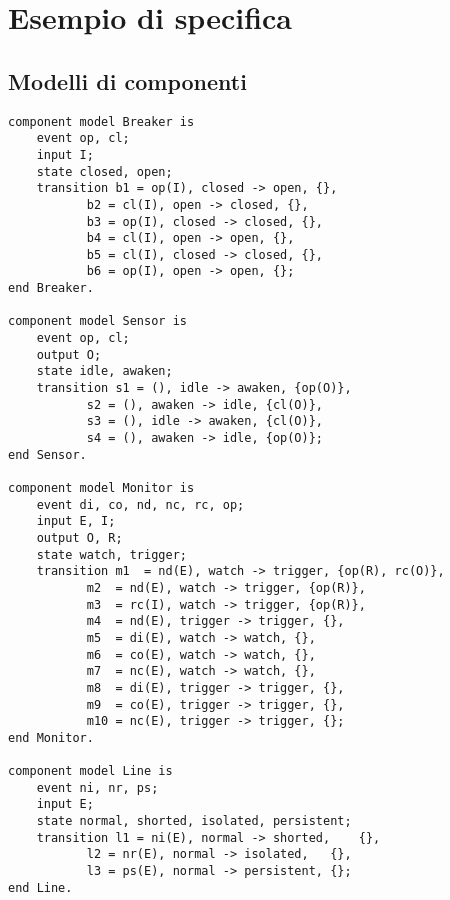 \chapter{Esempio di specifica} \label{spec_ex}
\section{Modelli di componenti}
\begin{verbatim}
component model Breaker is
	event op, cl;
	input I;
	state closed, open;
	transition b1 = op(I), closed -> open, {},
		   b2 = cl(I), open -> closed, {},
	 	   b3 = op(I), closed -> closed, {},
		   b4 = cl(I), open -> open, {},
		   b5 = cl(I), closed -> closed, {},
		   b6 = op(I), open -> open, {};
end Breaker.

component model Sensor is
	event op, cl;
	output O;
	state idle, awaken;
	transition s1 = (), idle -> awaken, {op(O)},
		   s2 = (), awaken -> idle, {cl(O)},
		   s3 = (), idle -> awaken, {cl(O)},
		   s4 = (), awaken -> idle, {op(O)};
end Sensor.

component model Monitor is
	event di, co, nd, nc, rc, op;
	input E, I;	
	output O, R;
	state watch, trigger;
	transition m1  = nd(E), watch -> trigger, {op(R), rc(O)},
		   m2  = nd(E), watch -> trigger, {op(R)},
		   m3  = rc(I), watch -> trigger, {op(R)},
		   m4  = nd(E), trigger -> trigger, {},
		   m5  = di(E), watch -> watch, {},
		   m6  = co(E), watch -> watch, {},
		   m7  = nc(E), watch -> watch, {},
		   m8  = di(E), trigger -> trigger, {},
		   m9  = co(E), trigger -> trigger, {},
		   m10 = nc(E), trigger -> trigger, {};
end Monitor.

component model Line is
	event ni, nr, ps;
	input E;
	state normal, shorted, isolated, persistent;
	transition l1 = ni(E), normal -> shorted,    {},
		   l2 = nr(E), normal -> isolated,   {},
		   l3 = ps(E), normal -> persistent, {};
end Line.
\end{verbatim}

